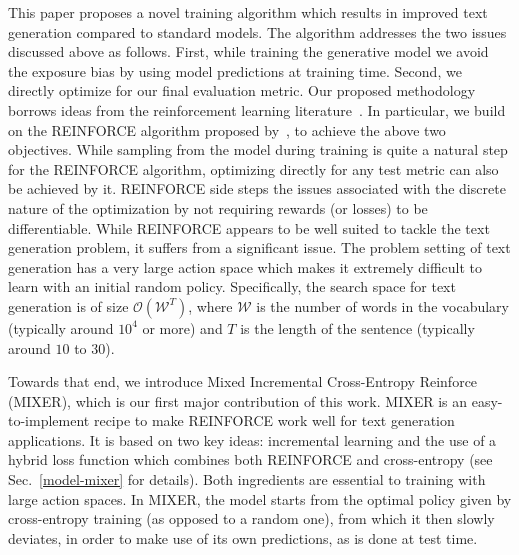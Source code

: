 This paper proposes a novel training algorithm which results in improved text generation compared to standard models. The algorithm addresses the two issues discussed above as follows. First, while training the generative model we avoid the exposure bias by using model predictions at training time. Second, we directly optimize for our final evaluation metric. Our proposed methodology borrows ideas from the reinforcement learning literature~\citep{sutton-rl}. In particular, we build on the REINFORCE algorithm proposed by~\citet{reinforce}, to achieve the above two objectives. While sampling from the model during training is quite a natural step for the REINFORCE algorithm, optimizing directly for any test metric can also be achieved by it. REINFORCE side steps the issues associated with the discrete nature of the optimization by not requiring rewards (or losses) to be differentiable. 
While REINFORCE appears to be well suited to tackle the text generation problem, it suffers from a significant issue. 
The problem setting of text generation has a very large action space which makes it extremely difficult to learn with an initial random policy.
Specifically, the search space for text generation is of size $\mathcal{O}(\mathcal{W}^T)$, where  $\mathcal{W}$ is the number of words in the vocabulary (typically around $10^4$ or more) and $T$ is the length of the sentence (typically around $10$ to $30$). 

Towards that end, we introduce Mixed Incremental Cross-Entropy Reinforce (MIXER), which is our first major contribution of this work. MIXER is an easy-to-implement recipe to make REINFORCE work well for text generation applications. It is based on two key ideas: 
incremental learning and the use of a hybrid loss function which
combines both REINFORCE and cross-entropy (see Sec.~\ref{model-mixer} for details). Both ingredients are essential to training with large action spaces.
In MIXER, the model starts from the optimal policy given by cross-entropy training (as opposed to a random one), from which it then slowly deviates, 
in order to make use of its own predictions, as is done at test time.

